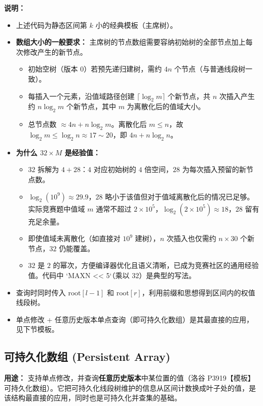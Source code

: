 \textbf{说明：}
\begin{itemize}
  \item 上述代码为静态区间第 $k$ 小的经典模板（主席树）。
  \item \textbf{数组大小的一般要求：} 主席树的节点数组需要容纳初始树的全部节点加上每次修改产生的新节点。
          \begin{itemize}
            \item 初始空树（版本 0）若预先递归建树，需约 $4n$ 个节点（与普通线段树一致）。
            \item 每插入一个元素，沿值域路径创建 $\lceil \log_2 m \rceil$ 个新节点，共 $n$ 次插入产生约 $n \log_2 m$ 个新节点，其中 $m$ 为离散化后的值域大小。
            \item 总节点数 $\approx 4n + n \log_2 m$。离散化后 $m \le n$，故 $\log_2 m \le \log_2 n \approx 17 \sim 20$，即 $4n + n \log_2 n$。
          \end{itemize}
  \item \textbf{为什么 $32 \times M$ 是经验值：}
          \begin{itemize}
            \item $32$ 拆解为 $4 + 28$：$4$ 对应初始树的 $4$ 倍空间，$28$ 为每次插入预留的新节点数。
            \item $\log_2(10^9) \approx 29.9$，$28$ 略小于该值但对于值域离散化后的情况已足够。实际竞赛题中值域 $m$ 通常不超过 $2 \times 10^5$，$\log_2(2 \times 10^5) \approx 18$，$28$ 留有充足余量。
            \item 即使值域未离散化（如直接对 $10^9$ 建树），$n$ 次插入也仅需约 $n \times 30$ 个新节点，$32$ 仍能覆盖。
            \item $32$ 是 $2$ 的幂次，方便编译器优化且语义清晰，已成为竞赛社区的通用经验值。代码中 `MAXN << 5`（乘以 $32$）是典型的写法。
          \end{itemize}
  \item 查询时同时传入 $\text{root}[l-1]$ 和 $\text{root}[r]$，利用前缀和思想得到区间内的权值线段树。
  \item 单点修改 + 任意历史版本单点查询（即可持久化数组）是其最直接的应用，见下节模板。
\end{itemize}

\subsection{可持久化数组 (Persistent Array)}

\textbf{用途：}
支持单点修改，并查询\textbf{任意历史版本}中某位置的值（洛谷 P3919【模板】可持久化数组）。它把可持久化线段树维护的信息从区间计数换成叶子处的值，是该结构最直接的应用，同时也是可持久化并查集的基础。

